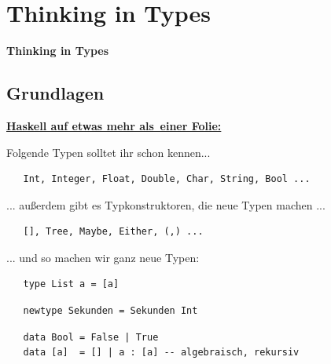 \documentclass[unknownkeysallowed]{beamer}
\begin{document}
\section{Thinking in Types}
\begin{frame}

    \begin{center}
    \Large\textbf{Thinking in Types}
    \end{center}

\end{frame}

  \subsection{Grundlagen}
  \begin{frame}[fragile]
  
  \Large\textbf{\underline{Haskell auf \tiny etwas mehr als \,\Large einer Folie:}} \bigskip \normalsize
  
  Folgende Typen solltet ihr schon kennen...
  
  \begin{verbatim}
   Int, Integer, Float, Double, Char, String, Bool ...
  \end{verbatim}
  
  \pause
  
  ... außerdem gibt es Typkonstruktoren, die neue Typen machen ...
  
  \begin{verbatim}
   [], Tree, Maybe, Either, (,) ...
  \end{verbatim}
  
  \pause
  
  ... und so machen wir ganz neue Typen:

  \begin{verbatim}
   type List a = [a]
  \end{verbatim}
  
  \pause  
   
  \begin{verbatim}
   newtype Sekunden = Sekunden Int
  \end{verbatim}
  
  \pause
  
  \begin{verbatim}
   data Bool = False | True
   data [a]  = [] | a : [a] -- algebraisch, rekursiv
  \end{verbatim}
  
\end{frame}
\end{document}
